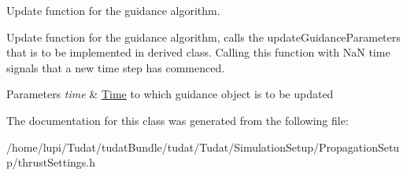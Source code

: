 Update function for the guidance algorithm. 

Update function for the guidance algorithm, calls the update\+Guidance\+Parameters that is to be implemented in derived class. Calling this function with NaN time signals that a new time step has commenced. 
\begin{DoxyParams}{Parameters}
{\em time} & \hyperlink{classtudat_1_1Time}{Time} to which guidance object is to be updated \\
\hline
\end{DoxyParams}


The documentation for this class was generated from the following file\+:\begin{DoxyCompactItemize}
\item 
/home/lupi/\+Tudat/tudat\+Bundle/tudat/\+Tudat/\+Simulation\+Setup/\+Propagation\+Setup/thrust\+Settings.\+h\end{DoxyCompactItemize}
